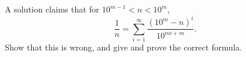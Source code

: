 A solution claims that for $10^{m-1}<n<10^m$,
\[\dfrac1n=\sum_{i=1}^{\infty}\dfrac{(10^m-n)^i}{10^{mi+m}}.\]
Show that this is wrong, and give and prove the correct formula.
